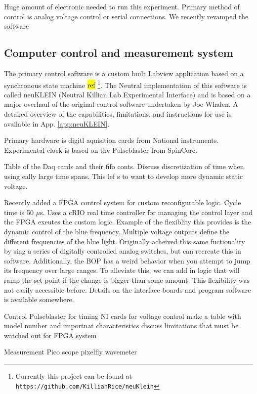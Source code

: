 Huge amount of electronic needed to run this experiment. 
Primary method of control is analog voltage control or serial connections. 
We recently revamped the software 

\subsection{Computer control and measurement system} \label{ssec:comp_sys}
The primary control software is a custom built Labview application based on a synchronous state machine \hl{ref} \footnote{Currently this project can be found at \texttt{https://github.com/KillianRice/neuKlein}}.
The Neutral implementation of this software is called neuKLEIN (Neutral Killian Lab Experimental Interface) and is based on a major overhaul of the original control software undertaken by Joe Whalen.
A detailed overview of the capabilities, limitations, and instructions for use is available in App. \ref{app:neuKLEIN}.


Primary hardware is digitl aquisition cards from National instruments.
Experimental clock is based on the Pulseblaster from SpinCore.

Table of the Daq cards and their fifo conts.
Discuss discretization of time when using eally large time spans.
This lef s to want to develop more dynamic static voltage.

Recently added a FPGA control system for custom reconfigurable logic.
Cycle time is 50 $\mu$s.
Uses a cRIO real time controller for managing the control layer and the FPGA exeutes the custom logic.
Example of the flexiblity this provides is the dynamic control of the blue frequency.
Multiple voltage outputs define the different frequencies of the blue light.
Originally acheived this same fuctionality by sing a series of digitally controlled analog switches, but can recreate this in software.
Additionally, the BOP has a weird behavior when you attempt to jump its frequency over large ranges. To alleviate this, we can add in logic that will ramp the set point if the change is bigger than some amount.
This flexibility was not easily accessible before.
Details on the interface boards and program software is available somewhere.

Control
	Pulseblaster for timing
	NI cards for voltage control
		make a table with model number and importnat characteristics
		discuss limitations that must be watched out for
	FPGA system

Measurement
	Pico scope
	pixelfly
	wavemeter

